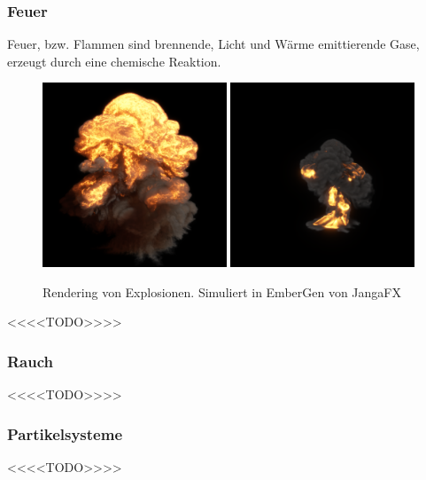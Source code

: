 \subsubsection{Feuer}
Feuer, bzw. Flammen sind brennende, Licht und Wärme emittierende Gase, erzeugt durch eine chemische Reaktion. 
\begin{figure}[h!]
	\includegraphics[width=0.49\textwidth]{Grafiken/Basics/Fire/explosion_0000.png}
	\includegraphics[width=0.49\textwidth]{Grafiken/Basics/Fire/explosion2_0000_0000.png}
	\centering
	\begin{footnotesize}
		\caption{Rendering von Explosionen. Simuliert in EmberGen von JangaFX }

		\label{fig:explosion}
	\end{footnotesize}
\end{figure}

<<<<TODO>>>>

\subsubsection{Rauch}
<<<<TODO>>>>

\subsubsection{Partikelsysteme}
<<<<TODO>>>>
